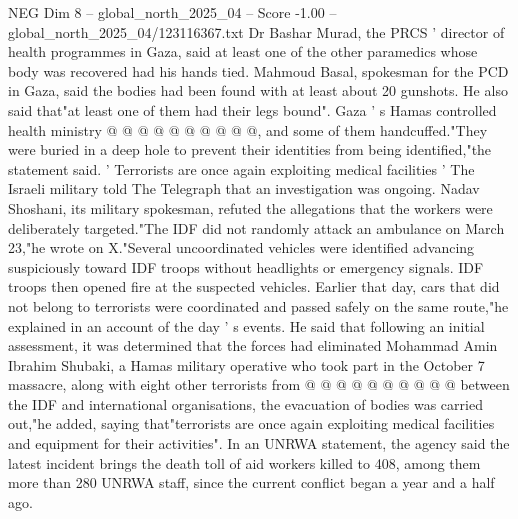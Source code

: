 \begin{textsample}{NEG Dim 8 – global\_north\_2025\_04 – Score -1.00 – global\_north\_2025\_04/123116367.txt}
Dr Bashar Murad, the PRCS ' director of health programmes in Gaza, said at least one of the other paramedics whose body was recovered had his hands tied.
Mahmoud Basal, spokesman for the PCD in Gaza, said the bodies had been found with at least about 20 gunshots.
He also said that"at least one of them had their legs bound".
Gaza ' s Hamas controlled health ministry @ @ @ @ @ @ @ @ @ @, and some of them handcuffed."They were buried in a deep hole to prevent their identities from being identified,"the statement said. ' Terrorists are once again exploiting medical facilities ' The Israeli military told The Telegraph that an investigation was ongoing.
Nadav Shoshani, its military spokesman, refuted the allegations that the workers were deliberately targeted."The IDF did not randomly attack an ambulance on March 23,"he wrote on X."Several uncoordinated vehicles were identified advancing suspiciously toward IDF troops without headlights or emergency signals.
IDF troops then opened fire at the suspected vehicles.
Earlier that day, cars that did not belong to terrorists were coordinated and passed safely on the same route,"he explained in an account of the day ' s events.
He said that following an initial assessment, it was determined that the forces had eliminated Mohammad Amin Ibrahim Shubaki, a Hamas military operative who took part in the October 7 massacre, along with eight other terrorists from @ @ @ @ @ @ @ @ @ @ between the IDF and international organisations, the evacuation of bodies was carried out,"he added, saying that"terrorists are once again exploiting medical facilities and equipment for their activities".
In an UNRWA statement, the agency said the latest incident brings the death toll of aid workers killed to 408, among them more than 280 UNRWA staff, since the current conflict began a year and a half ago.

\end{textsample}
